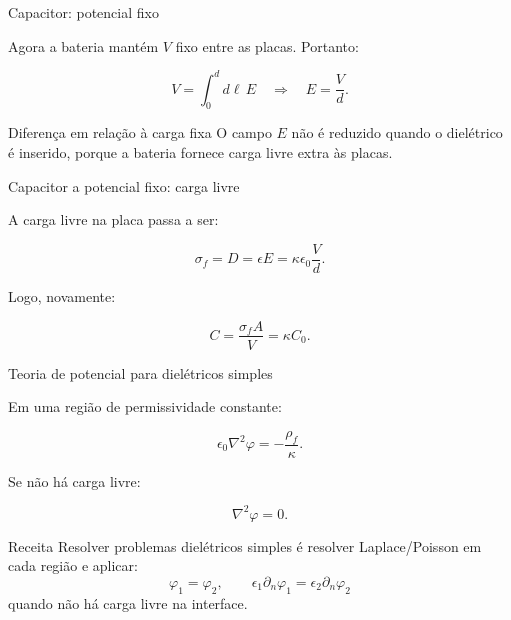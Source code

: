 \documentclass[aspectratio=169]{beamer}
\begin{document}
\begin{frame}{Capacitor: potencial fixo}

\small

Agora a bateria mantém \(V\) fixo entre as placas. Portanto:

\begin{eqbox}
\begin{equation}
V=\int_0^d d\ell\,E
\quad\Rightarrow\quad
E=\frac{V}{d}.
\tag{6.62--6.63}
\end{equation}
\end{eqbox}

\begin{mybox}{Diferença em relação à carga fixa}
O campo \(E\) não é reduzido quando o dielétrico é inserido, porque a bateria
fornece carga livre extra às placas.
\end{mybox}

\end{frame}

\begin{frame}{Capacitor a potencial fixo: carga livre}

\small

A carga livre na placa passa a ser:

\[
\sigma_f=D=\epsilon E=\kappa\epsilon_0\frac{V}{d}.
\tag{6.65}
\]

Logo, novamente:

\begin{eqbox}
\[
C=\frac{\sigma_f A}{V}
=
\kappa C_0.
\tag{6.66}
\]
\end{eqbox}

\end{frame}

\begin{frame}{Teoria de potencial para dielétricos simples}

\small

Em uma região de permissividade constante:

\begin{eqbox}
\begin{equation}
\epsilon_0\nabla^2\varphi
=
-\frac{\rho_f}{\kappa}.
\tag{6.69}
\end{equation}
\end{eqbox}

Se não há carga livre:

\begin{eqbox}
\begin{equation}
\nabla^2\varphi=0.
\tag{6.72}
\end{equation}
\end{eqbox}

\begin{mybox}{Receita}
Resolver problemas dielétricos simples é resolver Laplace/Poisson em cada
região e aplicar:
\[
\varphi_1=\varphi_2,
\qquad
\epsilon_1\partial_n\varphi_1=\epsilon_2\partial_n\varphi_2
\]
quando não há carga livre na interface.
\end{mybox}

\end{frame}
\end{document}
